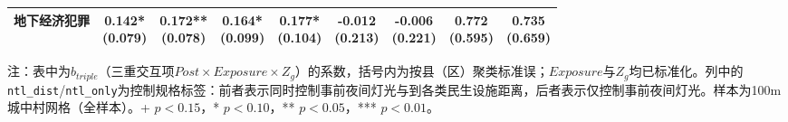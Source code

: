 \documentclass[a4paper,12pt]{report}
\begin{document}
\begin{table}[H]
\begin{adjustbox}{width=\textwidth,center}
\begin{tabular}{lcccccccc}
地下经济犯罪 & \makecell{0.142*\\(0.079)} & \makecell{0.172**\\(0.078)} & \makecell{0.164*\\(0.099)} & \makecell{0.177*\\(0.104)} & \makecell{-0.012\\(0.213)} & \makecell{-0.006\\(0.221)} & \makecell{0.772\\(0.595)} & \makecell{0.735\\(0.659)} \\
\bottomrule
\end{tabular}
\end{adjustbox}
\vspace{0.15cm}

\par\raggedright{} 注：表中为$b_{triple}$（三重交互项$Post\times Exposure\times Z_g$）的系数，括号内为按县（区）聚类标准误；$Exposure$与$Z_g$均已标准化。列中的\texttt{ntl\_dist}/\texttt{ntl\_only}为控制规格标签：前者表示同时控制事前夜间灯光与到各类民生设施距离，后者表示仅控制事前夜间灯光。样本为100m城中村网格（全样本）。+ $p<0.15$，* $p<0.10$，** $p<0.05$，*** $p<0.01$。
\end{table}
\end{document}
